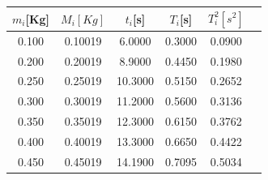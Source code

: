 \documentclass[10pt]{article}
\begin{document}
\begin{multicols}{2}
\begin{center}
	\begin{adjustbox}{width=245pt}
		\begin{tabular}{|c|c|c|c|c|c|}
			\hline
			$m_{i}$[Kg] & $M_{i}[Kg]$ & $t_{i}$[s] & $T_{i}$[s]  &$T^{2}_{i}[s^{2}]$  \\
			\hline
			0.100 & 0.10019 & 6.0000& 0.3000 & 0.0900 \\
			\hline
			0.200 & 0.20019 & 8.9000& 0.4450 & 0.1980 \\
			\hline
			0.250 & 0.25019 & 10.3000 & 0.5150 & 0.2652 \\
			\hline
			0.300 & 0.30019 & 11.2000 & 0.5600 & 0.3136 \\
			\hline
			0.350 & 0.35019 & 12.3000 & 0.6150 &0.3762 \\ 
			\hline
			0.400 & 0.40019 & 13.3000 & 0.6650 & 0.4422\\
			\hline
			0.450 & 0.45019 & 14.1900 & 0.7095 & 0.5034\\
			\hline
		\end{tabular}
	\end{adjustbox}
\end{center}
\end{multicols}
\end{document}
